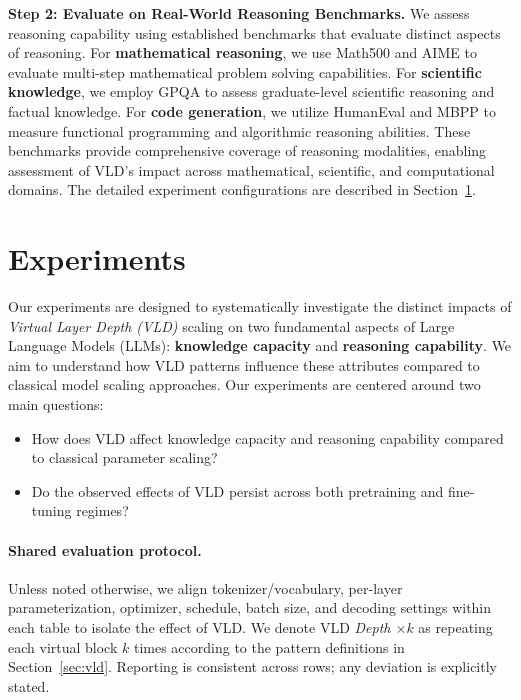 \documentclass{article} %
\begin{document}
\textbf{Step 2: Evaluate on Real-World Reasoning Benchmarks.} We assess reasoning capability using established benchmarks that evaluate distinct aspects of reasoning. For \textbf{mathematical reasoning}, we use Math500\citep{hendrycks2021measuring} and AIME\citep{aime} to evaluate multi-step mathematical problem solving capabilities. For \textbf{scientific knowledge}, we employ GPQA\citep{rein2024gpqa} to assess graduate-level scientific reasoning and factual knowledge. For \textbf{code generation}, we utilize HumanEval\citep{chen2021evaluating} and MBPP\citep{austin2021program} to measure functional programming and algorithmic reasoning abilities. These benchmarks provide comprehensive coverage of reasoning modalities, enabling assessment of VLD's impact across mathematical, scientific, and computational domains. The detailed experiment configurations are described in Section~\ref{sec:experiments}.






\section{Experiments}
\label{sec:experiments}

Our experiments are designed to systematically investigate the distinct impacts of \emph{Virtual Layer Depth (VLD)} scaling on two fundamental aspects of Large Language Models (LLMs): \textbf{knowledge capacity} and \textbf{reasoning capability}. We aim to understand how VLD patterns influence these attributes compared to classical model scaling approaches. Our experiments are centered around two main questions:
\begin{itemize}
    \item How does VLD affect knowledge capacity and reasoning capability compared to classical parameter scaling?
    \item Do the observed effects of VLD persist across both pretraining and fine-tuning regimes?
\end{itemize}

\paragraph{Shared evaluation protocol.}
Unless noted otherwise, we align tokenizer/vocabulary, per-layer parameterization, optimizer, schedule, batch size, and decoding settings within each table to isolate the effect of VLD. We denote VLD \emph{Depth $\times k$} as repeating each virtual block $k$ times according to the pattern definitions in Section~\ref{sec:vld}. Reporting is consistent across rows; any deviation is explicitly stated.
\end{document}
